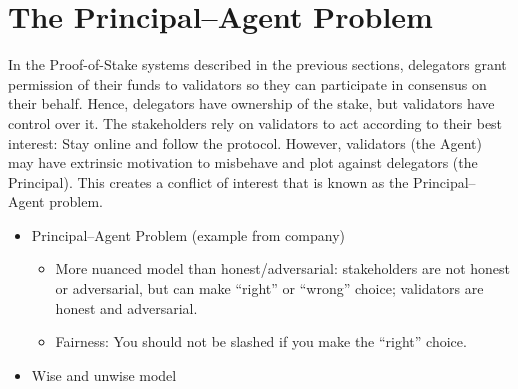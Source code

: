 \section{The Principal--Agent Problem}
In the Proof-of-Stake systems described in the previous sections,
delegators grant permission of their funds to validators so they can
participate in consensus on their behalf.
Hence, delegators have ownership of the stake, but
validators have control over it.
The stakeholders rely on validators to act according to their
best interest: Stay online and follow the protocol.
However, validators (the Agent) may have extrinsic motivation to
misbehave and plot against delegators (the Principal). This creates
a conflict of interest that is known as the Principal--Agent problem.




\begin{itemize}
    \item Principal--Agent Problem (example from company)
        \begin{itemize}
            \item More nuanced model than honest/adversarial: stakeholders are not honest or adversarial, but can make ``right'' or ``wrong'' choice; validators are honest and adversarial.
            \item Fairness: You should not be slashed if you make the ``right'' choice.
        \end{itemize}
    \item Wise and unwise model
\end{itemize}
